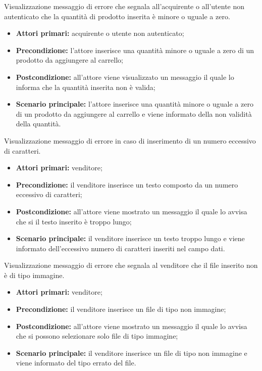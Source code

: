 Visualizzazione messaggio di errore che segnala all'acquirente o all'utente non autenticato che la quantità di prodotto inserita è minore o uguale a zero.
\begin{itemize}
    \item \textbf{Attori primari:} acquirente o utente non autenticato;
    \item \textbf{Precondizione:} l'attore inserisce una quantità minore o uguale a zero di un prodotto da aggiungere al carrello;
    \item \textbf{Postcondizione:} all'attore viene visualizzato un messaggio il quale lo informa che la quantità inserita non è valida;
    \item \textbf{Scenario principale:} l'attore inserisce una quantità minore o uguale a zero di un prodotto da aggiungere al carrello e viene informato della non validità della quantità.
\end{itemize}

Visualizzazione messaggio di errore in caso di inserimento di un numero eccessivo di caratteri.
\begin{itemize}
	\item \textbf{Attori primari:} venditore;
	\item \textbf{Precondizione:} il venditore inserisce un testo composto da un numero eccessivo di caratteri;
	\item \textbf{Postcondizione:} all'attore viene mostrato un messaggio il quale lo avvisa che si il testo inserito è troppo lungo;
	\item \textbf{Scenario principale:} il venditore inserisce un testo troppo lungo e viene informato dell'eccessivo numero di caratteri inseriti nel campo dati.
\end{itemize}

Visualizzazione messaggio di errore che segnala al venditore che il file inserito non è di tipo immagine.
\begin{itemize}
    \item \textbf{Attori primari:} venditore;
    \item \textbf{Precondizione:} il venditore inserisce un file di tipo non immagine;
    \item \textbf{Postcondizione:} all'attore viene mostrato un messaggio il quale lo avvisa che si possono selezionare solo file di tipo immagine;
    \item \textbf{Scenario principale:} il venditore inserisce un file di tipo non immagine e viene informato del tipo errato del file.
\end{itemize}

